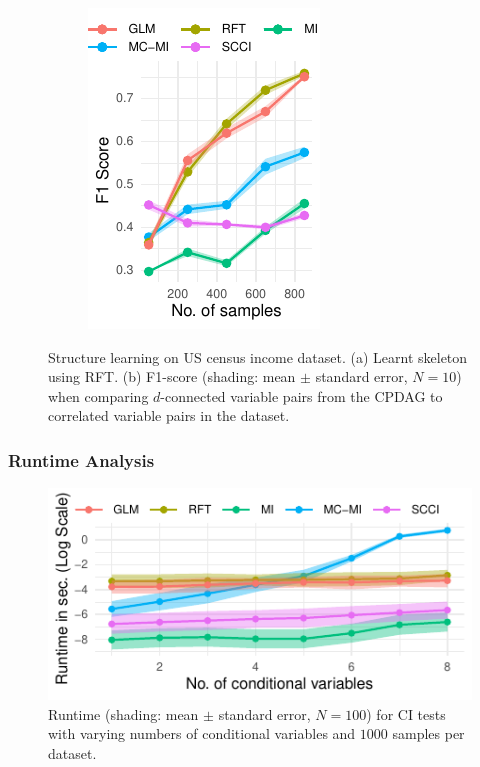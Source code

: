 \documentclass{beamer}
\begin{document}
\begin{frame}
\begin{figure}
\begin{subfigure}{0.33\textwidth}
			\includegraphics{imgs/adult_F1.pdf}
			\caption*{}
			\label{fig:sl_adult}
		\end{subfigure}
		\caption*{Structure learning on US census income dataset. (a)
		Learnt skeleton using RFT. (b) F1-score (shading: mean $\pm$
		standard error, $N=10$) when comparing $d$-connected variable
		pairs from the CPDAG to correlated variable pairs in the
		dataset.}
	\end{figure}
\end{frame}

\begin{frame}
	\frametitle{Runtime Analysis}
	\begin{figure}
		\centering
		\includegraphics{imgs/runtime.pdf}
		\caption*{Runtime (shading: mean $\pm$ standard error, $N=100$)
		for CI tests with varying numbers of conditional variables and
		$1000$ samples per dataset.
		}
	\end{figure}
\end{frame}
\end{document}
